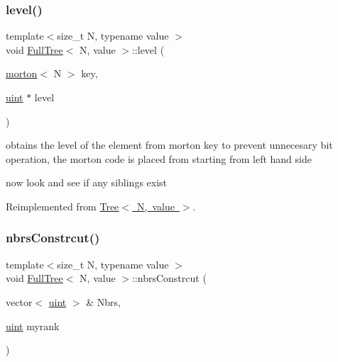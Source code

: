 \mbox{\label{classFullTree_a2aadfbda309e246642550044712f98a0}} 
\subsubsection{\texorpdfstring{level()}{level()}}
{\footnotesize\ttfamily template$<$size\+\_\+t N, typename value $>$ \\
void \mbox{\hyperlink{classFullTree}{Full\+Tree}}$<$ N, value $>$\+::level (\begin{DoxyParamCaption}\item[{\mbox{\hyperlink{definitions_8h_af8682350bd8bb38ee9023f7a0a310add}{morton}}$<$ N $>$}]{key,  }\item[{\mbox{\hyperlink{definitions_8h_a69aa29b598b851b0640aa225a9e5d61d}{uint}} $\ast$}]{level }\end{DoxyParamCaption})\hspace{0.3cm}{\ttfamily [virtual]}}

obtains the level of the element from morton key to prevent unnecesary bit operation, the morton code is placed from starting from left hand side

now look and see if any siblings exist 

Reimplemented from \mbox{\hyperlink{classTree_a01f065cafedac5e2845e9d17bf87b783}{Tree$<$ N, value $>$}}.

\mbox{\label{classFullTree_ade3b60e3f3622a49edb5b7a88e348667}} 
\subsubsection{\texorpdfstring{nbrs\+Constrcut()}{nbrsConstrcut()}}
{\footnotesize\ttfamily template$<$size\+\_\+t N, typename value $>$ \\
void \mbox{\hyperlink{classFullTree}{Full\+Tree}}$<$ N, value $>$\+::nbrs\+Constrcut (\begin{DoxyParamCaption}\item[{vector$<$ \mbox{\hyperlink{definitions_8h_a69aa29b598b851b0640aa225a9e5d61d}{uint}} $>$ \&}]{Nbrs,  }\item[{\mbox{\hyperlink{definitions_8h_a69aa29b598b851b0640aa225a9e5d61d}{uint}}}]{myrank }\end{DoxyParamCaption})}

